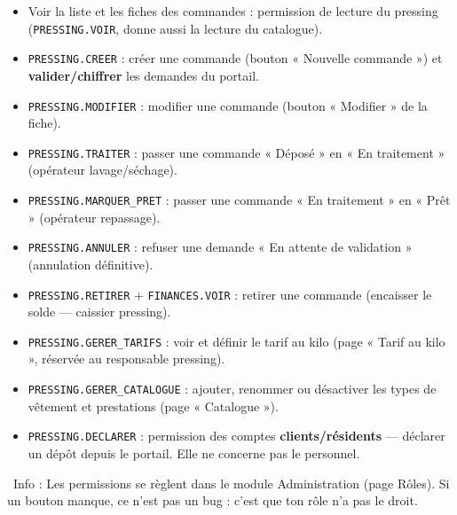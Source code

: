 \documentclass[12pt,a4paper]{article}
\newcommand{\info}[1]{\par\noindent\textcolor{lagoon}{\faInfoCircle\ Info : #1}\par}
\begin{document}
\begin{itemize}[label=\textcolor{lagoon}{\faKey}]
  \item Voir la liste et les fiches des commandes : permission de lecture du pressing (\texttt{PRESSING.VOIR}, donne aussi la lecture du catalogue).
  \item \texttt{PRESSING.CREER} : créer une commande (bouton « Nouvelle commande ») et \textbf{valider/chiffrer} les demandes du portail.
  \item \texttt{PRESSING.MODIFIER} : modifier une commande (bouton « Modifier » de la fiche).
  \item \texttt{PRESSING.TRAITER} : passer une commande « Déposé » en « En traitement » (opérateur lavage/séchage).
  \item \texttt{PRESSING.MARQUER\_PRET} : passer une commande « En traitement » en « Prêt » (opérateur repassage).
  \item \texttt{PRESSING.ANNULER} : refuser une demande « En attente de validation » (annulation définitive).
  \item \texttt{PRESSING.RETIRER} + \texttt{FINANCES.VOIR} : retirer une commande (encaisser le solde — caissier pressing).
  \item \texttt{PRESSING.GERER\_TARIFS} : voir et définir le tarif au kilo (page « Tarif au kilo », réservée au responsable pressing).
  \item \texttt{PRESSING.GERER\_CATALOGUE} : ajouter, renommer ou désactiver les types de vêtement et prestations (page « Catalogue »).
  \item \texttt{PRESSING.DECLARER} : permission des comptes \textbf{clients/résidents} — déclarer un dépôt depuis le portail. Elle ne concerne pas le personnel.
\end{itemize}

\info{Les permissions se règlent dans le module Administration (page Rôles). Si un bouton manque, ce n'est pas un bug : c'est que ton rôle n'a pas le droit.}

\vfill

\begin{center}
\end{center}
\end{document}
